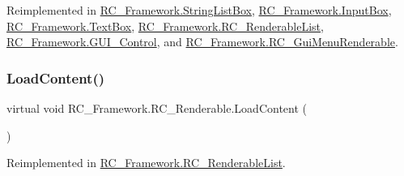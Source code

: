 Reimplemented in \mbox{\hyperlink{class_r_c___framework_1_1_string_list_box_a8b449ef1c2c786786b7e6cf52f416750}{R\+C\+\_\+\+Framework.\+String\+List\+Box}}, \mbox{\hyperlink{class_r_c___framework_1_1_input_box_a07ef881a281e4da95994e54ec1f7b496}{R\+C\+\_\+\+Framework.\+Input\+Box}}, \mbox{\hyperlink{class_r_c___framework_1_1_text_box_ae8c28e507b2c91aa042e2a5c2a300598}{R\+C\+\_\+\+Framework.\+Text\+Box}}, \mbox{\hyperlink{class_r_c___framework_1_1_r_c___renderable_list_a221a0bf056ff4f8e02d22e3b8b66de81}{R\+C\+\_\+\+Framework.\+R\+C\+\_\+\+Renderable\+List}}, \mbox{\hyperlink{class_r_c___framework_1_1_g_u_i___control_a458eb00bda180db22ebe22e550a669a4}{R\+C\+\_\+\+Framework.\+G\+U\+I\+\_\+\+Control}}, and \mbox{\hyperlink{class_r_c___framework_1_1_r_c___gui_menu_renderable_a2a1be820f5693b0badd408b5457c81bd}{R\+C\+\_\+\+Framework.\+R\+C\+\_\+\+Gui\+Menu\+Renderable}}.

\mbox{\label{class_r_c___framework_1_1_r_c___renderable_ae5283e88f2cc34c2ef010ede22ab1bfb}} 
\subsubsection{\texorpdfstring{Load\+Content()}{LoadContent()}}
{\footnotesize\ttfamily virtual void R\+C\+\_\+\+Framework.\+R\+C\+\_\+\+Renderable.\+Load\+Content (\begin{DoxyParamCaption}{ }\end{DoxyParamCaption})\hspace{0.3cm}{\ttfamily [virtual]}}



Reimplemented in \mbox{\hyperlink{class_r_c___framework_1_1_r_c___renderable_list_a953e8eb6f4422a7f0bebb17ee0455c42}{R\+C\+\_\+\+Framework.\+R\+C\+\_\+\+Renderable\+List}}.

\mbox{\label{class_r_c___framework_1_1_r_c___renderable_af929e80b7c88bb21b01358f47ad36a64}} 
